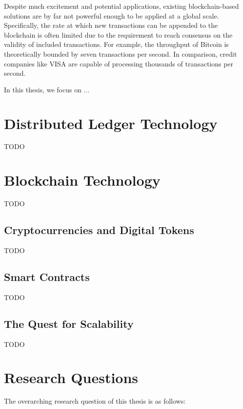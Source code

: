 Despite much excitement and potential applications, existing blockchain-based solutions are by far not powerful enough to be applied at a global scale.
Specifically, the rate at which new transactions can be appended to the blockchain is often limited due to the requirement to reach consensus on the validity of included transactions.
For example, the throughput of Bitcoin is theoretically bounded by seven transactions per second.
In comparison, credit companies like VISA are capable of processing thousands of transactions per second.


In this thesis, we focus on ...

\section{Distributed Ledger Technology}
TODO

\section{Blockchain Technology}
TODO

\subsection{Cryptocurrencies and Digital Tokens}
TODO

\subsection{Smart Contracts}
TODO

\subsection{The Quest for Scalability}
TODO


\section{Research Questions}

The overarching research question of this thesis is as follows:

